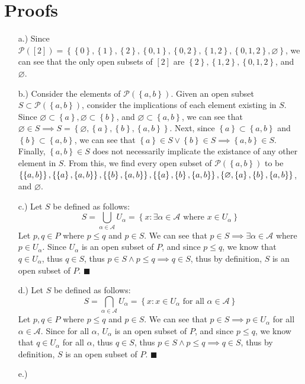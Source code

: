 \documentclass[12pt]{article}
\newcommand{\bracks}[1]{\left[#1\right]}             %
\newcommand{\braces}[1]{\left\{#1\right\}}           %
\newcommand{\parens}[1]{\left(#1\right)}             %
\begin{document}
\section*{Proofs}
\begin{itemize}
    \item [a.)] Since $\mathcal{P}\parens{\bracks{2}}=\braces{\braces{0},\braces{1},\braces{2},\braces{0,1},\braces{0,2},\braces{1,2},\braces{0,1,2},\varnothing}$, we can see that the only open subsets of $\bracks2$ are $\braces{2},\braces{1,2},\braces{0,1,2}$, and $\varnothing$.

    \item [b.)] Consider the elements of $\mathcal{P}(\braces{a,b})$. Given an open subset $S\subset\mathcal{P}(\braces{a,b})$, consider the implications of each element existing in $S$. Since $\varnothing\subset\braces{a},\varnothing\subset\braces{b}$, and $\varnothing\subset\braces{a,b}$, we can see that $\varnothing\in S\implies S=\braces{\varnothing,\braces{a},\braces{b},\braces{a,b}}$. Next, since $\braces{a}\subset\braces{a,b}$ and $\braces{b}\subset\braces{a,b}$, we can see that $\braces{a}\in S\lor\braces{b}\in S\implies\braces{a,b}\in S$. Finally, $\braces{a,b}\in S$ does not necessarily implicate the existance of any other element in $S$. From this, we find every open subset of $\mathcal{P}(\braces{a,b})$ to be $\braces{\braces{a,b}},\braces{\braces{a},\braces{a,b}},\braces{\braces{b},\braces{a,b}},\braces{\braces{a},\braces{b},\braces{a,b}},\break\braces{\varnothing,\braces{a},\braces{b},\braces{a,b}}$, and $\varnothing$.

    \item [c.)] Let $S$ be defined as follows:
    \[S=\bigcup_{\alpha\in\mathcal{A}}U_\alpha=\braces{x:\exists\alpha\in\mathcal{A}\text{ where }x\in U_\alpha}\]
    Let $p,q\in P$ where $p\leq q$ and $p\in S$. We can see that $p\in S\implies\exists\alpha\in\mathcal{A}$ where $p\in U_\alpha$. Since $U_\alpha$ is an open subset of $P$, and since $p\leq q$, we know that $q\in U_\alpha$, thus $q\in S$, thus $p\in S\land p\leq q\implies q\in S$, thus by definition, $S$ is an open subset of $P$. $\blacksquare$

    \item [d.)] Let $S$ be defined as follows:
    \[S=\bigcap_{\alpha\in\mathcal{A}}U_\alpha=\braces{x:x\in U_\alpha\text{ for all }\alpha\in\mathcal{A}}\]
    Let $p,q\in P$ where $p\leq q$ and $p\in S$. We can see that $p\in S\implies p\in U_\alpha$ for all $\alpha\in\mathcal{A}$. Since for all $\alpha$, $U_\alpha$ is an open subset of $P$, and since $p\leq q$, we know that $q\in U_\alpha$ for all $\alpha$, thus $q\in S$, thus $p\in S\land p\leq q\implies q\in S$, thus by definition, $S$ is an open subset of $P$. $\blacksquare$

    \item [e.)] 

\end{itemize}
\end{document}
